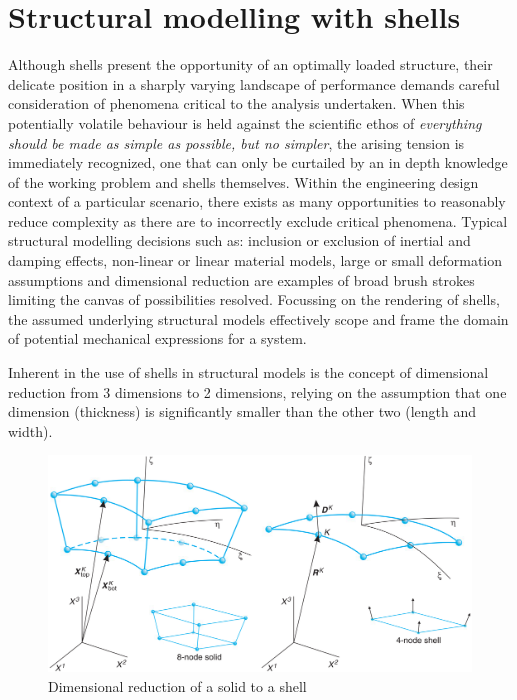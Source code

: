 \section{Structural modelling with shells}
Although shells present the opportunity of an optimally loaded structure, their delicate position in a sharply varying landscape of performance demands careful consideration of phenomena critical to the analysis undertaken. When this potentially volatile behaviour is held against the scientific ethos of \textit{everything should be made as simple as possible, but no simpler}, the arising tension is immediately recognized, one that can only be curtailed by an in depth knowledge of the working problem and shells themselves. Within the engineering design context of a particular scenario, there exists as many opportunities to reasonably reduce complexity as there are to incorrectly exclude critical phenomena. Typical structural modelling decisions such as: inclusion or exclusion of inertial and damping effects, non-linear or linear material models, large or small deformation assumptions and dimensional reduction are examples of broad brush strokes limiting the canvas of possibilities resolved. Focussing on the rendering of shells, the assumed underlying structural models  effectively scope and frame the domain of potential mechanical expressions for a system.

Inherent in the use of shells in structural models is the concept of dimensional reduction from 3 dimensions to 2 dimensions, relying on the assumption that one dimension (thickness) is significantly smaller than the other two (length and width). 

\begin{figure}[H]
	\centering
	\def\svgwidth{\columnwidth}
	\includegraphics[width=12cm]{images/degenerateshell.png}
	\caption{Dimensional reduction of a solid to a shell \cite{BischLitBook04}}
	\label{dimReduction}
\end{figure}

